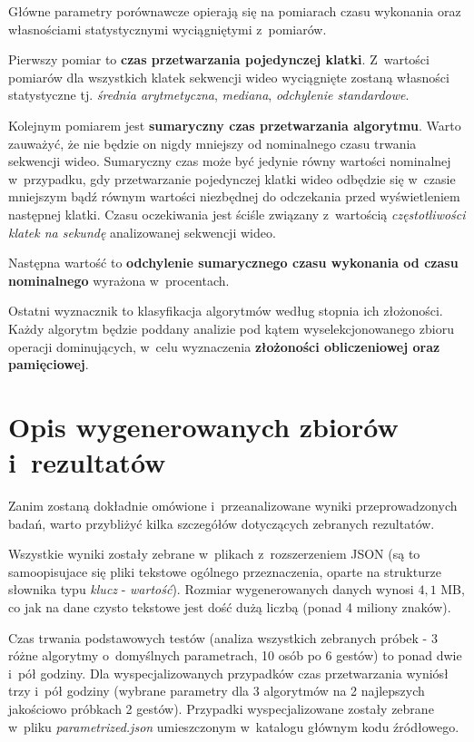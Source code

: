       Główne parametry porównawcze opierają się na pomiarach czasu wykonania oraz własnościami statystycznymi wyciągniętymi z~pomiarów.

      Pierwszy pomiar to \textbf{czas przetwarzania pojedynczej klatki}. Z~wartości pomiarów dla wszystkich klatek sekwencji wideo wyciągnięte zostaną własności statystyczne tj. \textit{średnia arytmetyczna}, \textit{mediana}, \textit{odchylenie standardowe}.

      Kolejnym pomiarem jest \textbf{sumaryczny czas przetwarzania algorytmu}. Warto zauważyć, że nie będzie on nigdy mniejszy od nominalnego czasu trwania sekwencji wideo. Sumaryczny czas może być jedynie równy wartości nominalnej w~przypadku, gdy przetwarzanie pojedynczej klatki wideo odbędzie się w~czasie mniejszym bądź równym wartości niezbędnej do odczekania przed wyświetleniem następnej klatki. Czasu oczekiwania jest ściśle związany z~wartością \textit{częstotliwości klatek na sekundę} analizowanej sekwencji wideo.

      Następna wartość to \textbf{odchylenie sumarycznego czasu wykonania od czasu nominalnego} wyrażona w~procentach.

      Ostatni wyznacznik to klasyfikacja algorytmów według stopnia ich złożoności. Każdy algorytm będzie poddany analizie pod kątem wyselekcjonowanego zbioru operacji dominujących, w~celu wyznaczenia \textbf{złożoności obliczeniowej oraz pamięciowej}.

  \section{Opis wygenerowanych zbiorów i~rezultatów}\label{Section_Results}
    Zanim zostaną dokładnie omówione i~przeanalizowane wyniki przeprowadzonych badań, warto przybliżyć kilka szczegółów dotyczących zebranych rezultatów.

    Wszystkie wyniki zostały zebrane w~plikach z~rozszerzeniem JSON (są to samoopisujace się pliki tekstowe ogólnego przeznaczenia, oparte na strukturze słownika typu \textit{klucz} - \textit{wartość}). Rozmiar wygenerowanych danych wynosi $4,1$ MB, co jak na dane czysto tekstowe jest dość dużą liczbą (ponad 4 miliony znaków).

    Czas trwania podstawowych testów (analiza wszystkich zebranych próbek - 3 różne algorytmy o~domyślnych parametrach, 10 osób po 6 gestów) to ponad dwie i~pół godziny. Dla wyspecjalizowanych przypadków czas przetwarzania wyniósł trzy i~pół godziny (wybrane parametry dla 3 algorytmów na 2 najlepszych jakościowo próbkach 2 gestów). Przypadki wyspecjalizowane zostały zebrane w~pliku \textit{parametrized.json} umieszczonym w~katalogu głównym kodu źródłowego.

